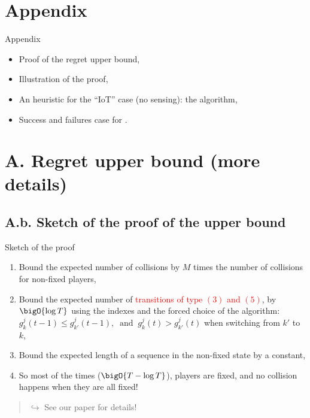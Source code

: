 \documentclass[12pt,english,ignorenonframetext,aspectratio=169,]{beamer}
\providecommand{\tightlist}{%
  \setlength{\itemsep}{0pt}\setlength{\parskip}{0pt}}
\begin{document}
\appendix{}


\section{\hfill{}Appendix\hfill{}}

\begin{frame}{Appendix}

\begin{itemize}
\tightlist
\item
  Proof of the regret upper bound,
\item
  Illustration of the proof,
\item
  An heuristic for the ``IoT'' case (no sensing): the \Selfish{} algorithm,
\item
  Success and failures case for \Selfish{}.
\end{itemize}

\end{frame}


\section{\hfill{}A. Regret upper bound (more details)\hfill{}}

\subsection{\hfill{}A.b. Sketch of the proof of the upper bound\hfill{}}

\begin{frame}{Sketch of the proof}

\begin{enumerate}
\def\labelenumi{\arabic{enumi}.}
\item
  Bound the expected number of collisions by \(M\) times the number of
  collisions for non-fixed players,\pause
\item
  Bound the expected number of
  \textcolor<2>{red}{transitions of type $(3)$ and $(5)$}, by
  \(\bigO{\log T}\) using the \klUCB{} indexes and the forced choice of
  the algorithm:
  \(g_k^j(t-1) \leq g^j_{k'}(t-1), \;\;\text{and}\;\; g_k^j(t) > g^j_{k'}(t)\)
  when switching from \(k'\) to \(k\),\pause
\item
  Bound the expected length of a sequence in the non-fixed state by a
  constant,\pause
\item
  So most of the times (\(\bigO{T - \log T}\)), players are fixed, and
  no collision happens when they are all fixed!
\end{enumerate}

\begin{quote}
\strut

\hfill\(\hookrightarrow\) See our paper for details!
\end{quote}

\end{frame}
\end{document}
